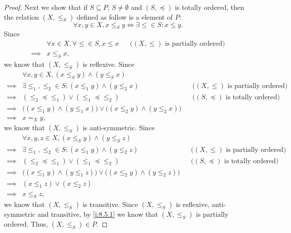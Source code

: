 \begin{proof}
  Next we show that if \(S \subseteq P\), \(S \neq \emptyset\) and \((S, \preceq)\) is totally ordered, then the relation \((X, \leq_S)\) defined as follow is a element of \(P\):
  \[
    \forall x, y \in X, x \leq_S y \iff \exists \leq \in S : x \leq y.
  \]
  Since
  \begin{align*}
             & \forall x \in X, \forall \leq \in S, x \leq x &  & \text{(\((X, \leq)\) is partially ordered)} \\
    \implies & x \leq_S x,
  \end{align*}
  we know that \((X, \leq_S)\) is reflexive.
  Since
  \begin{align*}
             & \forall x, y \in X, (x \leq_S y) \land (y \leq_S x)                                                                                        \\
    \implies & \exists \leq_1, \leq_2 \in S : (x \leq_1 y) \land (y \leq_2 x)                           &  & \text{(\((X, \leq)\) is partially ordered)}  \\
    \implies & (\leq_2 \preceq \leq_1) \lor (\leq_1 \preceq \leq_2)                                     &  & \text{(\((S, \preceq)\) is totally ordered)} \\
    \implies & \big((x \leq_1 y) \land (y \leq_1 x)\big) \lor \big((x \leq_2 y) \land (y \leq_2 x)\big)                                                   \\
    \implies & x =_X y,
  \end{align*}
  we know that \((X, \leq_S)\) is anti-symmetric.
  Since
  \begin{align*}
             & \forall x, y, z \in X, (x \leq_S y) \land (y \leq_S z)                                                                                     \\
    \implies & \exists \leq_1, \leq_2 \in S : (x \leq_1 y) \land (y \leq_2 z)                           &  & \text{(\((X, \leq)\) is partially ordered)}  \\
    \implies & (\leq_2 \preceq \leq_1) \lor (\leq_1 \preceq \leq_2)                                     &  & \text{(\((S, \preceq)\) is totally ordered)} \\
    \implies & \big((x \leq_1 y) \land (y \leq_1 z)\big) \lor \big((x \leq_2 y) \land (y \leq_2 z)\big)                                                   \\
    \implies & (x \leq_1 z) \lor (x \leq_2 z)                                                                                                             \\
    \implies & x \leq_S z,
  \end{align*}
  we know that \((X, \leq_S)\) is transitive.
  Since \((X, \leq_S)\) is reflexive, anti-symmetric and transitive, by \cref{i:8.5.1} we know that \((X, \leq_S)\) is partially ordered.
  Thus, \((X, \leq_S) \in P\).


\end{proof}
